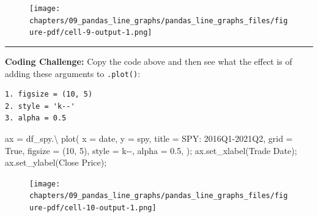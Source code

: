 \documentclass[
  letterpaper,
  DIV=11,
  numbers=noendperiod]{scrreprt}
\newenvironment{Shaded}{\begin{snugshade}}{\end{snugshade}}
\newcommand{\DecValTok}[1]{\textcolor[rgb]{0.68,0.00,0.00}{#1}}
\newcommand{\FloatTok}[1]{\textcolor[rgb]{0.68,0.00,0.00}{#1}}
\newcommand{\NormalTok}[1]{\textcolor[rgb]{0.00,0.23,0.31}{#1}}
\newcommand{\OperatorTok}[1]{\textcolor[rgb]{0.37,0.37,0.37}{#1}}
\newcommand{\StringTok}[1]{\textcolor[rgb]{0.13,0.47,0.30}{#1}}
\newcommand{\VariableTok}[1]{\textcolor[rgb]{0.07,0.07,0.07}{#1}}
\begin{document}
\begin{figure}[H]

{\centering \texttt{[image: chapters/09\_pandas\_line\_graphs/pandas\_line\_graphs\_files/figure-pdf/cell-9-output-1.png]}

}

\end{figure}

\begin{center}\rule{0.5\linewidth}{0.5pt}\end{center}

\textbf{Coding Challenge:} Copy the code above and then see what the
effect is of adding these arguments to \texttt{.plot()}:

\begin{verbatim}
1. figsize = (10, 5)
2. style = 'k--'
3. alpha = 0.5
\end{verbatim}

\begin{Shaded}
\begin{Highlighting}[]
\NormalTok{ax }\OperatorTok{=}\NormalTok{ df\_spy.}\OperatorTok{\textbackslash{}}
\NormalTok{        plot(}
\NormalTok{            x }\OperatorTok{=} \StringTok{\textquotesingle{}date\textquotesingle{}}\NormalTok{,}
\NormalTok{            y }\OperatorTok{=} \StringTok{\textquotesingle{}spy\textquotesingle{}}\NormalTok{,}
\NormalTok{            title }\OperatorTok{=} \StringTok{\textquotesingle{}SPY: 2016Q1{-}2021Q2\textquotesingle{}}\NormalTok{,}
\NormalTok{            grid }\OperatorTok{=} \VariableTok{True}\NormalTok{,}
\NormalTok{            figsize }\OperatorTok{=}\NormalTok{ (}\DecValTok{10}\NormalTok{, }\DecValTok{5}\NormalTok{),}
\NormalTok{            style }\OperatorTok{=} \StringTok{\textquotesingle{}k{-}{-}\textquotesingle{}}\NormalTok{,}
\NormalTok{            alpha }\OperatorTok{=} \FloatTok{0.5}\NormalTok{,}
\NormalTok{        )}\OperatorTok{;}
\NormalTok{ax.set\_xlabel(}\StringTok{\textquotesingle{}Trade Date\textquotesingle{}}\NormalTok{)}\OperatorTok{;}
\NormalTok{ax.set\_ylabel(}\StringTok{\textquotesingle{}Close Price\textquotesingle{}}\NormalTok{)}\OperatorTok{;}
\end{Highlighting}
\end{Shaded}

\begin{figure}[H]

{\centering \texttt{[image: chapters/09\_pandas\_line\_graphs/pandas\_line\_graphs\_files/figure-pdf/cell-10-output-1.png]}

}

\end{figure}
\end{document}
